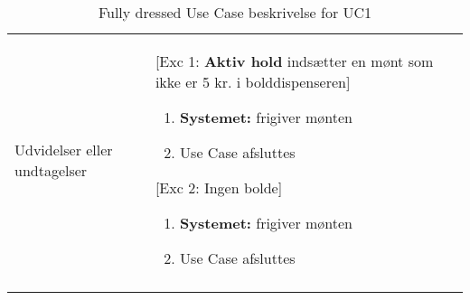 \documentclass[Kravspecifikation/Kravspec_Main.tex]{subfiles}
\begin{document}
\begin{longtable}[]{@{}ll@{}}
\begin{minipage}[t]{0.47\columnwidth}
\end{minipage}\tabularnewline
\toprule
\begin{minipage}[t]{0.47\columnwidth}\raggedright
{Udvidelser eller undtagelser}\strut
\end{minipage} & \begin{minipage}[t]{0.47\columnwidth}\raggedright
{[Exc 1: \textbf{Aktiv hold} indsætter en mønt som ikke er 5 kr. i bolddispenseren]}
\begin{enumerate}
\tightlist
\item \textbf{Systemet:} frigiver mønten
\item Use Case afsluttes
\end{enumerate}
{[Exc 2: Ingen bolde]}
\begin{enumerate}
\tightlist
\item \textbf{Systemet:} frigiver mønten
\item Use Case afsluttes
\end{enumerate}
{}\strut
\end{minipage}\tabularnewline
\bottomrule
\bottomrule
\caption{Fully dressed Use Case beskrivelse for UC1}
\label{tab:UC1}
\end{longtable}
\end{document}
